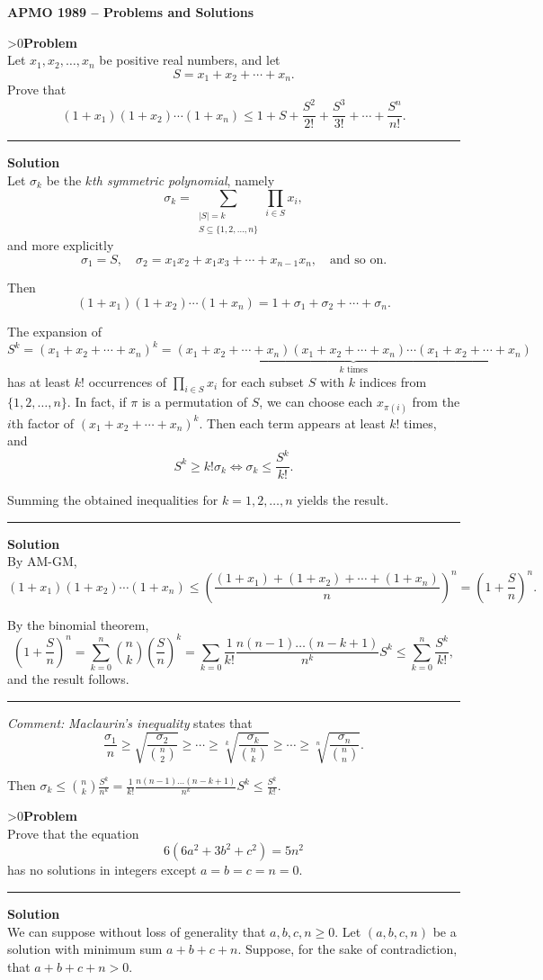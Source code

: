 \documentclass[12pt,oneside,a4paper]{book}
\newcounter{probnum}
\newcounter{solnum}
\newcommand{\prob}{\ifnum\value{probnum}>0\newpage\fi\setcounter{solnum}{0}\stepcounter{probnum}\textbf{Problem \theprobnum}\\}
\newcommand{\comment}{\medskip\hrule\medbreak\emph{Comment: }}
\newcommand{\sol}{\medskip\hrule\medbreak\textbf{Solution}\\}
\newcommand{\soln}{\stepcounter{solnum}\medskip\hrule\medbreak\textbf{Solution \thesolnum}\\}
\begin{document}
\begin{center}
\textbf{\large APMO 1989 -- Problems and Solutions}
\end{center}

\prob Let $x_1,x_2,\ldots,x_n$ be positive real numbers, and let
\[S=x_1+x_2+\cdots+x_n.\]
Prove that
\[(1+x_1)(1+x_2)\cdots(1+x_n)\le 1 + S + \frac{S^2}{2!} + \frac{S^3}{3!} + \cdots + \frac{S^n}{n!}.\]

\soln
Let $\sigma_k$ be the \emph{$k$th symmetric polynomial}, namely
\[\sigma_k = \sum_{\substack{|S|=k\\ S\subseteq\{1,2,\ldots,n\}}}\prod_{i\in S}x_i,\]
and more explicitly
\[\sigma_1 = S,\quad \sigma_2 = x_1x_2 + x_1x_3 + \cdots + x_{n-1}x_n,\quad \text{and so on.}\]

Then
\[(1+x_1)(1+x_2)\cdots(1+x_n) = 1 + \sigma_1 + \sigma_2 + \cdots + \sigma_n.\]

The expansion of
\[S^k = (x_1+x_2+\cdots+x_n)^k = \underbrace{(x_1+x_2+\cdots+x_n)(x_1+x_2+\cdots+x_n)\cdots (x_1+x_2+\cdots+x_n)}_{k\text{ times}}\]
has at least $k!$ occurrences of $\prod_{i\in S}x_i$ for each subset $S$ with $k$ indices from $\{1,2,\ldots,n\}$. In fact, if $\pi$ is a permutation of $S$, we can choose each $x_{\pi(i)}$ from the $i$th factor of $(x_1+x_2+\cdots+x_n)^k$. Then each term appears at least $k!$ times, and
\[S^k \ge k!\sigma_k\iff \sigma_k \le \frac{S^k}{k!}.\]

Summing the obtained inequalities for $k=1,2,\ldots,n$ yields the result.

\soln
By AM-GM,
\[(1+x_1)(1+x_2)\cdots(1+x_n) \le \left(\frac{(1+x_1)+(1+x_2)+\cdots+(1+x_n)}n\right)^n = \left(1+\frac Sn\right)^n.\]

By the binomial theorem,
\[\left(1+\frac Sn\right)^n = \sum_{k=0}^n\binom nk\left(\frac Sn\right)^k = \sum_{k=0} \frac1{k!}\frac{n(n-1)\ldots(n-k+1)}{n^k}S^k \le \sum_{k=0}^n\frac{S^k}{k!},\]
and the result follows.

\comment
\emph{Maclaurin's inequality} states that
\[\frac{\sigma_1}n \ge \sqrt{\frac{\sigma_2}{\binom n2}} \ge \cdots \ge \sqrt[k]{\frac{\sigma_k}{\binom nk}} \ge \cdots \ge \sqrt[n]{\frac{\sigma_n}{\binom nn}}.\]

Then $\sigma_k \le \binom nk\frac{S^k}{n^k} = \frac1{k!}\frac{n(n-1)\ldots(n-k+1)}{n^k}S^k \le \frac{S^k}{k!}$.

\prob Prove that the equation
\[6(6a^2+3b^2+c^2)=5n^2\]
has no solutions in integers except $a=b=c=n=0$.

\sol
We can suppose without loss of generality that $a,b,c,n\ge 0$. Let $(a,b,c,n)$ be a solution with minimum sum $a+b+c+n$. Suppose, for the sake of contradiction, that $a+b+c+n > 0$.
\end{document}
